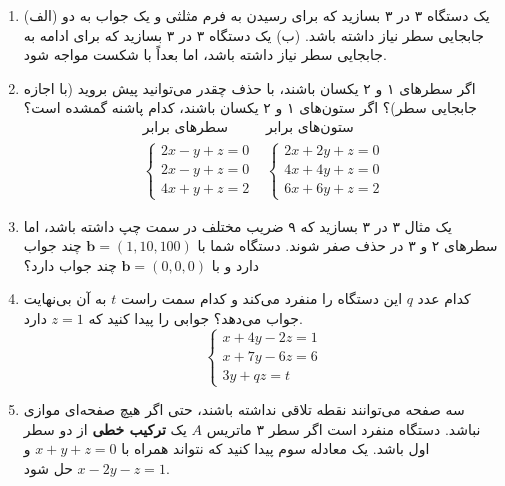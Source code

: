 \documentclass[12pt, a4paper]{book}
\theoremstyle{translator}
\begin{document}
\begin{enumerate}
		\item (الف) یک دستگاه ۳ در ۳ بسازید که برای رسیدن به فرم مثلثی و یک جواب به دو جابجایی سطر نیاز داشته باشد.
		(ب) یک دستگاه ۳ در ۳ بسازید که برای ادامه به جابجایی سطر نیاز داشته باشد، اما بعداً با شکست مواجه شود.
		
		\item اگر سطرهای ۱ و ۲ یکسان باشند، با حذف چقدر می‌توانید پیش بروید (با اجازه جابجایی سطر)؟ اگر ستون‌های ۱ و ۲ یکسان باشند، کدام پاشنه گمشده است؟
		\[
		\begin{array}{cc}
			\textbf{سطرهای برابر} & \textbf{ستون‌های برابر} \\
			\begin{cases}
				2x - y + z = 0 \\
				2x - y + z = 0 \\
				4x + y + z = 2
			\end{cases}
			&
			\begin{cases}
				2x + 2y + z = 0 \\
				4x + 4y + z = 0 \\
				6x + 6y + z = 2
			\end{cases}
		\end{array}
		\]
		
		\item یک مثال ۳ در ۳ بسازید که ۹ ضریب مختلف در سمت چپ داشته باشد، اما سطرهای ۲ و ۳ در حذف صفر شوند. دستگاه شما با $\mathbf{b}=(1, 10, 100)$ چند جواب دارد و با $\mathbf{b}=(0,0,0)$ چند جواب دارد؟
		
		\item کدام عدد $q$ این دستگاه را منفرد می‌کند و کدام سمت راست $t$ به آن بی‌نهایت جواب می‌دهد؟ جوابی را پیدا کنید که $z=1$ دارد.
		\[
		\begin{cases}
			x + 4y - 2z = 1 \\
			x + 7y - 6z = 6 \\
			3y + qz = t
		\end{cases}
		\]
		
		\item سه صفحه می‌توانند نقطه تلاقی نداشته باشند، حتی اگر هیچ صفحه‌ای موازی نباشد. دستگاه منفرد است اگر سطر ۳ ماتریس $A$ یک \textbf{ترکیب خطی} از دو سطر اول باشد. یک معادله سوم پیدا کنید که نتواند همراه با $x+y+z=0$ و $x-2y-z=1$ حل شود.
		

\end{enumerate}
\end{document}
